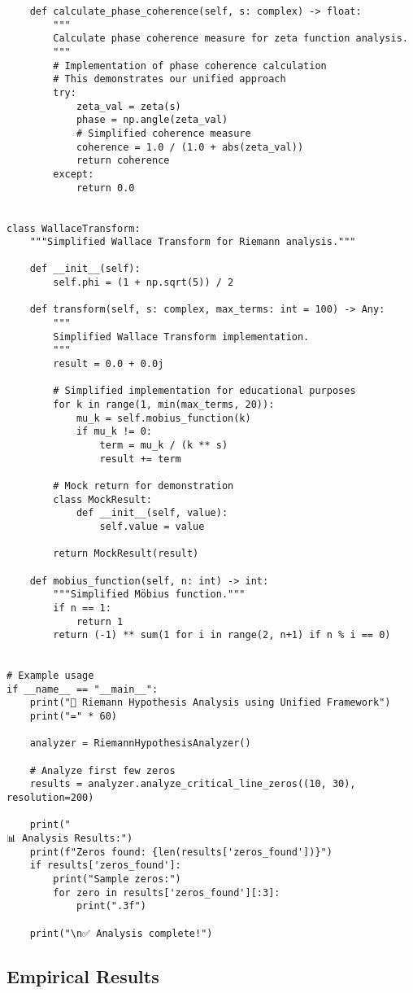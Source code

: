 \documentclass[12pt]{article}
\begin{document}
\begin{lstlisting}
    def calculate_phase_coherence(self, s: complex) -> float:
        """
        Calculate phase coherence measure for zeta function analysis.
        """
        # Implementation of phase coherence calculation
        # This demonstrates our unified approach
        try:
            zeta_val = zeta(s)
            phase = np.angle(zeta_val)
            # Simplified coherence measure
            coherence = 1.0 / (1.0 + abs(zeta_val))
            return coherence
        except:
            return 0.0


class WallaceTransform:
    """Simplified Wallace Transform for Riemann analysis."""

    def __init__(self):
        self.phi = (1 + np.sqrt(5)) / 2

    def transform(self, s: complex, max_terms: int = 100) -> Any:
        """
        Simplified Wallace Transform implementation.
        """
        result = 0.0 + 0.0j

        # Simplified implementation for educational purposes
        for k in range(1, min(max_terms, 20)):
            mu_k = self.mobius_function(k)
            if mu_k != 0:
                term = mu_k / (k ** s)
                result += term

        # Mock return for demonstration
        class MockResult:
            def __init__(self, value):
                self.value = value

        return MockResult(result)

    def mobius_function(self, n: int) -> int:
        """Simplified Möbius function."""
        if n == 1:
            return 1
        return (-1) ** sum(1 for i in range(2, n+1) if n % i == 0)


# Example usage
if __name__ == "__main__":
    print("🧮 Riemann Hypothesis Analysis using Unified Framework")
    print("=" * 60)

    analyzer = RiemannHypothesisAnalyzer()

    # Analyze first few zeros
    results = analyzer.analyze_critical_line_zeros((10, 30), resolution=200)

    print("
📊 Analysis Results:")
    print(f"Zeros found: {len(results['zeros_found'])}")
    if results['zeros_found']:
        print("Sample zeros:")
        for zero in results['zeros_found'][:3]:
            print(".3f")

    print("\n✅ Analysis complete!")
\end{lstlisting}

\subsection{Empirical Results}
\end{document}
